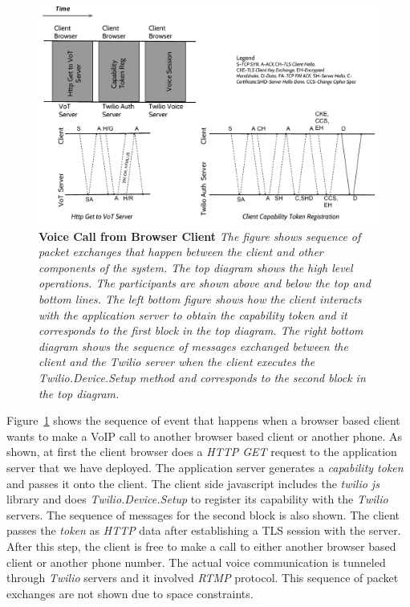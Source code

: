 \begin{figure}[t!] \centering
\includegraphics[width=\textwidth]{figs/voicecallpacketlevel.pdf}
\caption{\textbf{Voice Call from Browser Client} {\footnotesize\textit{
The figure shows sequence of packet exchanges that happen between the client and other components of the system. The top diagram shows the high level operations. The participants are shown above and below the top and bottom lines. The left bottom figure shows how the client interacts with the application server to obtain the \textit{capability token} and it corresponds to the first block in the top diagram. The right bottom diagram shows the sequence of messages exchanged between the client and the \textit{Twilio} server when the client executes the \textit{Twilio.Device.Setup} method and corresponds to the second block in the top diagram.  
}}}
\label{fig:messagelevel}
\end{figure}

Figure~\ref{fig:messagelevel} shows the sequence of event that happens when a browser based client wants to make a VoIP call to another browser based client or another phone. As shown, at first the client browser does a \textit{HTTP GET} request to the application server that we have deployed. The application server generates a \textit{capability token} and passes it onto the client. The client side javascript includes the \textit{twilio js} library and does \textit{Twilio.Device.Setup} to register its capability with the \textit{Twilio} servers. The sequence of messages for the second block is also shown. The client passes the \textit{token} as \textit{HTTP} data after establishing a TLS session with the server. After this step, the client is free to make a call to either another browser based client or another phone number. The actual voice communication is tunneled through \textit{Twilio} servers and it involved \textit{RTMP} protocol. This sequence of packet exchanges are not shown due to space constraints. 
